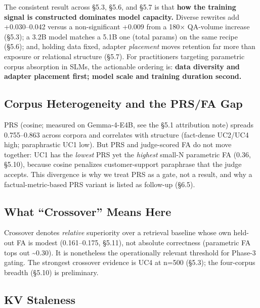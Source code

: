 The consistent result across §5.3, §5.6, and §5.7 is that \textbf{how the training signal is constructed dominates model capacity.} Diverse rewrites add +0.030--0.042 versus a non-significant +0.009 from a 180× QA-volume increase (§5.3); a 3.2B model matches a 5.1B one (total params) on the same recipe (§5.6); and, holding data fixed, adapter \emph{placement} moves retention far more than exposure or relational structure (§5.7). For practitioners targeting parametric corpus absorption in SLMs, the actionable ordering is: \textbf{data diversity and adapter placement first; model scale and training duration second.}

\hypertarget{corpus-heterogeneity-and-the-prsfa-gap}{%
\subsection{Corpus Heterogeneity and the PRS/FA Gap}\label{corpus-heterogeneity-and-the-prsfa-gap}}

PRS (cosine; measured on Gemma-4-E4B, see the §5.1 attribution note) spreads 0.755--0.863 across corpora and correlates with structure (fact-dense UC2/UC4 high; paraphrastic UC1 low). But PRS and judge-scored FA do not move together: UC1 has the \emph{lowest} PRS yet the \emph{highest} small-N parametric FA (0.36, §5.10), because cosine penalizes customer-support paraphrase that the judge accepts. This divergence is why we treat PRS as a gate, not a result, and why a factual-metric-based PRS variant is listed as follow-up (§6.5).

\hypertarget{what-crossover-means-here}{%
\subsection{What ``Crossover'' Means Here}\label{what-crossover-means-here}}

Crossover denotes \emph{relative} superiority over a retrieval baseline whose own held-out FA is modest (0.161--0.175, §5.11), not absolute correctness (parametric FA tops out \textasciitilde0.30). It is nonetheless the operationally relevant threshold for Phase-3 gating. The strongest crossover evidence is UC4 at n=500 (§5.3); the four-corpus breadth (§5.10) is preliminary.

\hypertarget{kv-staleness}{%
\subsection{KV Staleness}\label{kv-staleness}}

